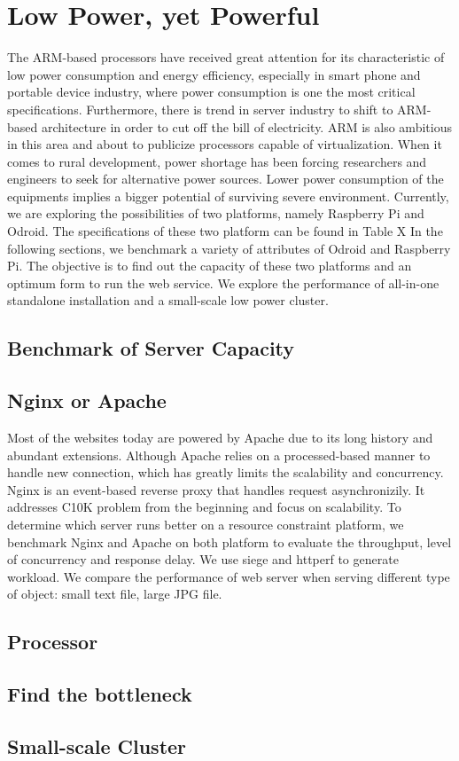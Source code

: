 \chapter{Low Power, yet Powerful}\label{benchmark}
The ARM-based processors have received great attention for its characteristic of low power consumption and energy efficiency, especially in smart phone and portable device industry, where power consumption is one the most critical specifications. Furthermore, there is trend in server industry to shift to ARM-based architecture in order to cut off the bill of electricity. ARM is also ambitious in this area and about to publicize processors capable of virtualization. When it comes to rural development, power shortage has been forcing researchers and engineers to seek for alternative power sources. Lower power consumption of the equipments implies a bigger potential of surviving severe environment.
Currently, we are exploring the possibilities of two platforms, namely Raspberry Pi and Odroid. The specifications of these two platform can be found in Table X
In the following sections, we benchmark a variety of attributes of Odroid and Raspberry Pi. The objective is to find out the capacity of these two platforms and an optimum form to run the web service. We explore the performance of all-in-one standalone installation and a small-scale low power cluster.

\section{Benchmark of Server Capacity}
\section{Nginx or Apache}
Most of the websites today are powered by Apache due to its long history and abundant extensions. Although Apache relies on a processed-based manner to handle new connection, which has greatly limits the scalability and concurrency. Nginx is an event-based reverse proxy that handles request asynchronizily. It addresses C10K problem from the beginning and focus on scalability.
To determine which server runs better on a resource constraint platform, we benchmark Nginx and Apache on both platform to evaluate the throughput, level of concurrency and response delay. We use siege and httperf to generate workload. We compare the performance of web server when serving different type of object: small text file, large JPG file.
\section{Processor}
\section{Find the bottleneck}
\section{Small-scale Cluster}
